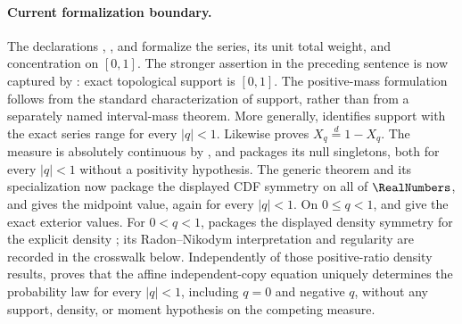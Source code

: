 \documentclass[11pt]{article}
\numberwithin{equation}{section}
\theoremstyle{definition}
\theoremstyle{remark}
\begin{document}
\paragraph{Current formalization boundary.}
The declarations ,
, and
 formalize the series, its unit total weight, and
concentration on $[0,1]$.  The stronger assertion in the preceding sentence is now captured
by : exact topological support is
$[0,1]$.  The positive-mass formulation follows from the standard characterization of
support, rather than from a separately named interval-mass theorem.  More generally,
 identifies support with the exact
series range for every $|q|<1$.  Likewise
 proves
$X_q\overset d=1-X_q$.  The measure is absolutely continuous by
, and
 packages its null singletons, both
for every \(|q|<1\) without a positivity hypothesis.  The generic theorem
 and its specialization
 now package the displayed CDF symmetry on all of
\(\RealNumbers\), and  gives the midpoint value, again for
every \(|q|<1\).  On \(0\le q<1\),
 and
 give the exact exterior values.  For \(0<q<1\),
 packages the displayed density symmetry for the
explicit density ; its Radon--Nikodym interpretation and
regularity are recorded in the crosswalk below.  Independently of those positive-ratio
density results,  proves that the
affine independent-copy equation uniquely determines the probability law for every
\(|q|<1\), including \(q=0\) and negative \(q\), without any support, density, or moment
hypothesis on the competing measure.
\end{document}
